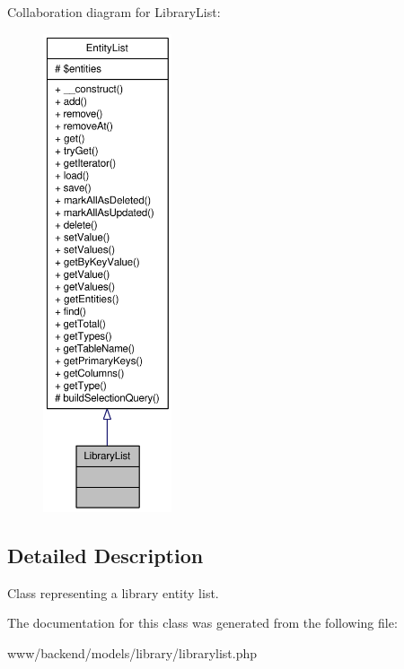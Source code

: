 Collaboration diagram for LibraryList:\nopagebreak
\begin{figure}[H]
\begin{center}
\leavevmode
\includegraphics[height=400pt]{classLibraryList__coll__graph}
\end{center}
\end{figure}


\subsection{Detailed Description}
Class representing a library entity list. 

The documentation for this class was generated from the following file:\begin{DoxyCompactItemize}
\item 
www/backend/models/library/librarylist.php\end{DoxyCompactItemize}
